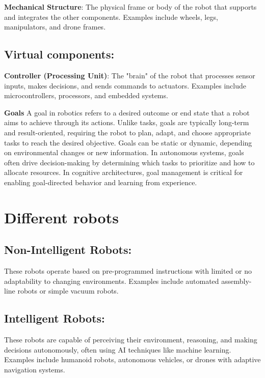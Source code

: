         \textbf{Mechanical Structure}: The physical frame or body of the robot that supports and integrates the other components.
        Examples include wheels, legs, manipulators, and drone frames.

    \subsection{Virtual components:}
        \textbf{Controller (Processing Unit)}: The "brain" of the robot that processes sensor inputs, makes decisions, and sends commands to actuators.
        Examples include microcontrollers, processors, and embedded systems.

        \textbf{Goals} A goal in robotics refers to a desired outcome or end state that a robot aims to achieve through its actions. Unlike tasks, goals are typically long-term and result-oriented, requiring the robot to plan, adapt, and choose appropriate tasks to reach the desired objective. Goals can be static or dynamic, depending on environmental changes or new information. In autonomous systems, goals often drive decision-making by determining which tasks to prioritize and how to allocate resources. In cognitive architectures, goal management is critical for enabling goal-directed behavior and learning from experience.
        




\section{Different robots}

    \subsection{Non-Intelligent Robots:} These robots operate based on pre-programmed instructions with limited or no adaptability to changing environments. Examples include automated assembly-line robots or simple vacuum robots. 

    \subsection{Intelligent Robots:} These robots are capable of perceiving their environment, reasoning, and making decisions autonomously, often using AI techniques like machine learning. Examples include humanoid robots, autonomous vehicles, or drones with adaptive navigation systems. 

